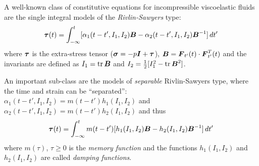 A well-known class of constitutive equations for incompressible viscoelastic fluids are the single integral
models of the \emph{Rivlin-Sawyers} type:
\begin{equation}
  \boldsymbol{\tau}(t) = \int_{-\infty}^t[\alpha_1(t-t',I_1,I_2)\boldsymbol{B}-\alpha_2(t-t',I_1,I_2)\boldsymbol{B}^{-1}]\,dt'
\end{equation}
where $\boldsymbol{\tau}$ is the extra-stress tensor ($\boldsymbol{\sigma}=-p\boldsymbol{I}+\boldsymbol{\tau}$), $\boldsymbol{B}=\boldsymbol{F}_{t'}(t)\cdot\boldsymbol{F}^T_{t'}(t)$ and the invariants are defined as $I_1=\operatorname{tr}\boldsymbol{B}$ and $I_2=\frac12[I_1^2-\operatorname{tr}\boldsymbol{B}^2]$.
 
An important sub-class are the models of \emph{separable} Rivlin-Sawyers type, where the time and strain can be ``separated'': $\alpha_1(t-t',I_1,I_2)=m(t-t')h_1(I_1,I_2)$ and $\alpha_2(t-t',I_1,I_2)=m(t-t')h_2(I_1,I_2)$ and thus
\begin{equation}
  \boldsymbol{\tau}(t) = \int_{-\infty}^tm(t-t')[h_1(I_1,I_2)\boldsymbol{B}-h_2(I_1,I_2)\boldsymbol{B}^{-1}]\,dt'
  \label{eq:separable}
\end{equation}
where $m(\tau)$, $\tau\geq0$ is the \emph{memory function} and the functions $h_1(I_1,I_2)$ and $h_2(I_1,I_2)$ are called \emph{damping functions}.




